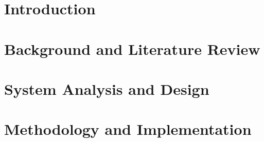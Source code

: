 \documentclass[12pt]{report}
\newcommand\blankpage{%
    \null
    \thispagestyle{empty}%
    \addtocounter{page}{-1}%
    \newpage}
\begin{document}
\renewcommand{\thepage}{\roman{page}}
\newcommand{\etal}{\textit{et al. }}















\tableofcontents

\setlength{\parskip}{0pt}

\listoffigures
{}
\listoftables




%





%




\clearpage
\setcounter{page}{1}
\setcounter{chapter}{0}
\renewcommand{\thepage}{\arabic{page}}	

\setlength{\parskip}{1em}


\chapter{Introduction}\label{cha:introduction}


\chapter{Background and Literature Review} \label{cha:LiteratureReviewU}


\chapter{System Analysis and Design} \label{cha:SystemAnalysisAndDesignU}


\chapter{Methodology and Implementation}
\label{cha:MethodologyAndImplementationU}

\end{document}
